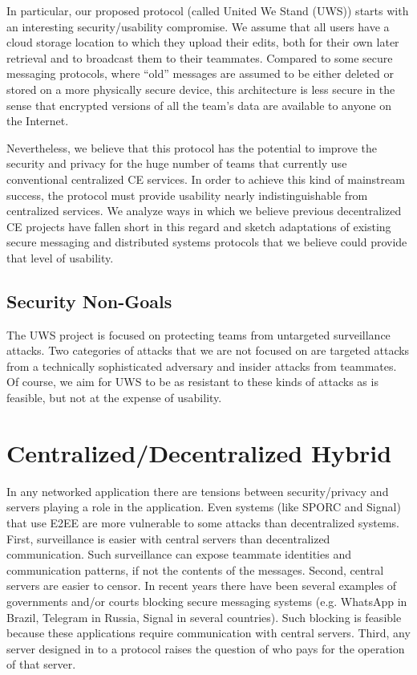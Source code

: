 \documentclass[runningheads]{llncs}
\begin{document}
In particular, our proposed protocol (called United We Stand (UWS)) starts with an interesting security{\slash}usability compromise.
We assume that all users have a cloud storage location to which they upload their edits, both for their own later retrieval and to broadcast them to their teammates.
Compared to some secure messaging protocols, where ``old'' messages are assumed to be either deleted or stored on a more physically secure device, this architecture is less secure in the sense that encrypted versions of all the team's data are available to anyone on the Internet.

Nevertheless, we believe that this protocol has the potential to improve the security and privacy for the huge number of teams that currently use conventional centralized CE services.
In order to achieve this kind of mainstream success, the protocol must provide usability nearly indistinguishable from centralized services.
We analyze ways in which we believe previous decentralized CE projects have fallen short in this regard and sketch adaptations of existing secure messaging and distributed systems protocols that we believe could provide that level of usability.

\subsection{Security Non-Goals}

The UWS project is focused on protecting teams from untargeted surveillance attacks.
Two categories of attacks that we are not focused on are targeted attacks from a technically sophisticated adversary and insider attacks from teammates.
Of course, we aim for UWS to be as resistant to these kinds of attacks as is feasible, but not at the expense of usability.

\section{Centralized/Decentralized Hybrid}

In any networked application there are tensions between security{\slash}privacy and servers playing a role in the application.
Even systems (like SPORC and Signal) that use E2EE are more vulnerable to some attacks than decentralized systems.
First, surveillance is easier with central servers than decentralized communication.
Such surveillance can expose teammate identities and communication patterns, if not the contents of the messages.
Second, central servers are easier to censor.
In recent years there have been several examples of governments and{\slash}or courts blocking secure messaging systems (e.g. WhatsApp in Brazil, Telegram in Russia, Signal in several countries).
Such blocking is feasible because these applications require communication with central servers.
Third, any server designed in to a protocol raises the question of who pays for the operation of that server.
\end{document}
